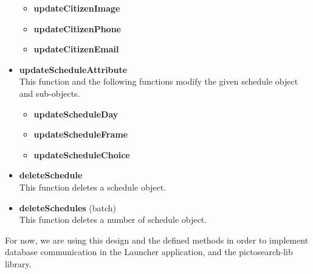 \begin{itemize}
    \begin{itemize}
        \item \textbf{updateCitizenImage}
        \item \textbf{updateCitizenPhone}
        \item \textbf{updateCitizenEmail}
    \end{itemize}
    \item \textbf{updateScheduleAttribute}\\
    This function and the following functions modify the given schedule object and sub-objects.
    \begin{itemize}
        \item \textbf{updateScheduleDay}
        \item \textbf{updateScheduleFrame}
        \item \textbf{updateScheduleChoice}
    \end{itemize}
    \item \textbf{deleteSchedule}\\
    This function deletes a schedule object.
    \item \textbf{deleteSchedules} (batch)\\
    This function deletes a number of schedule object.
\end{itemize}

For now, we are using this design and the defined methods in order to implement
database communication in the Launcher application, and the pictosearch-lib
library.
